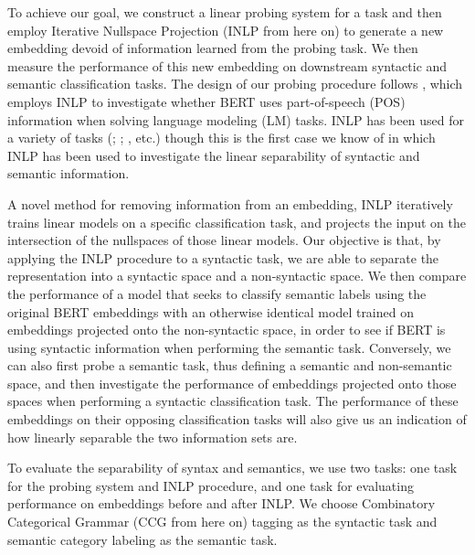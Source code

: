 \documentclass[11pt,a4paper]{article}
\begin{document}
To achieve our goal, we construct a linear probing system for a task and then employ Iterative Nullspace Projection (INLP from here on) \citep{inlp} to generate a new embedding devoid of information learned from the probing task. We then measure the performance of this new embedding on downstream syntactic and semantic classification tasks. The design of our probing procedure follows \citealp{amnesia}, which employs INLP to investigate whether BERT uses part-of-speech (POS) information when solving language modeling (LM) tasks. INLP has been used for a variety of tasks (\citealp{inlp}; \citealp{amnesia}; \citealp{mbertGreek}, etc.) though this is the first case we know of in which INLP has been used to investigate the linear separability of syntactic and semantic information. 

A novel method for removing information from an embedding, INLP iteratively trains linear models on a specific classification task, and projects the input on the intersection of the nullspaces of those linear models. Our objective is that, by applying the INLP procedure to a syntactic task, we are able to separate the representation into a syntactic space and a non-syntactic space. We then compare the performance of a model that seeks to classify semantic labels using the original BERT embeddings with an otherwise identical model trained on embeddings projected onto the non-syntactic space, in order to see if BERT is using syntactic information when performing the semantic task. Conversely, we can also first probe a semantic task, thus defining a semantic and non-semantic space, and then investigate the performance of embeddings projected onto those spaces when performing a syntactic classification task. The performance of these embeddings on their opposing classification tasks will also give us an indication of how linearly separable the two information sets are.%

To evaluate the separability of syntax and semantics, we use two tasks: one task for the probing system and INLP procedure, and one task for evaluating performance on embeddings before and after INLP. We choose Combinatory Categorical Grammar (CCG from here on) tagging \citep{ccg-bank} as the syntactic task and semantic category labeling \citep{propbank} as the semantic task. 
\end{document}
